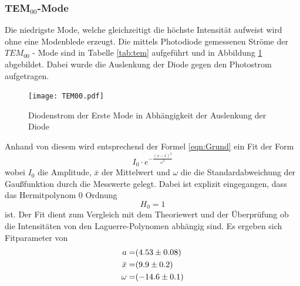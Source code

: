 \subsubsection{TEM$_\text{00}$-Mode}
Die niedrigste Mode, welche gleichzeitigt die höchste Intensität aufweist wird ohne eine Modenblede erzeugt. Die mittels Photodiode gemessenen Ströme der $TEM_{00}$ - Mode sind in Tabelle \ref{tab:tem} aufgeführt und in Abbildung \ref{fig:TEM00} abgebildet. Dabei wurde die Auslenkung der Diode gegen den Photostrom aufgetragen.
\begin{figure}
  \centering
  \texttt{[image: TEM00.pdf]}
  \caption{Diodenstrom der Erste Mode in Abhängigkeit der Auslenkung der Diode}
  \label{fig:TEM00}
\end{figure}
Anhand von diesem wird entsprechend der Formel \ref{eqn:Grund} ein Fit der Form 
\begin{equation}
  I_0 \cdot e^{- \frac{(x-\bar{x})^2}{\omega^2} }
  \label{eqn:gausian}
\end{equation}
wobei $I_0$ die Amplitude, $\bar{x}$ der Mittelwert und $\omega$ die die Standardabweichung der Gaußfunktion durch die Messwerte gelegt. Dabei ist explizit eingegangen, dass das Hermitpolynom 0 Ordnung 
\begin{equation}
  H_0 = 1
  \label{}
\end{equation}
ist. Der Fit dient zum Vergleich mit dem Theoriewert und der Überprüfung ob die Intensitäten von den Laguerre-Polynomen abhängig sind. Es ergeben sich Fitparameter von 
\begin{eqnarray}
  a =& (\num{4.53 +- 0.08})	\\
  \bar{x} =& (\num{9.9 +- 0.2})	\\
  \omega =& (\num{-14.6 +-0.1})	
  \label{eqn:coef}
\end{eqnarray}
